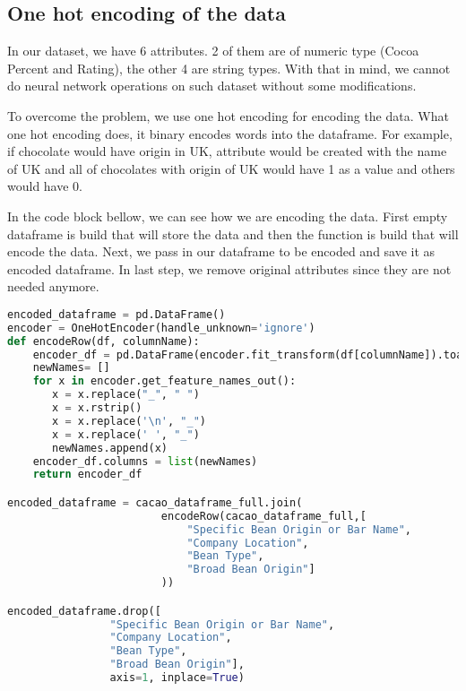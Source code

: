 \subsection{One hot encoding of the data}
In our dataset, we have 6 attributes. 2 of them are of numeric type (Cocoa Percent and Rating), the other 4 are string types. With that in mind, we cannot do neural network operations on such dataset without some modifications.

To overcome the problem, we use one hot encoding for encoding the data\parencite{jie2019one}. What one hot encoding does, it binary encodes words into the dataframe. For example, if chocolate would have origin in UK, attribute would be created with the name of UK and all of chocolates with origin of UK would have 1 as a value and others would have 0.

In the code block bellow, we can see how we are encoding the data. First empty dataframe is build that will store the data and then the function is build that will encode the data. Next, we pass in our dataframe to be encoded and save it as encoded dataframe. In last step, we remove original attributes since they are not needed anymore.

\begin{lstlisting}[language=Python, caption=One hot encoding of the data]
encoded_dataframe = pd.DataFrame()
encoder = OneHotEncoder(handle_unknown='ignore')
def encodeRow(df, columnName):
    encoder_df = pd.DataFrame(encoder.fit_transform(df[columnName]).toarray())
    newNames= []
    for x in encoder.get_feature_names_out():
       x = x.replace("_", " ")
       x = x.rstrip()
       x = x.replace('\n', "_")
       x = x.replace(' ', "_")
       newNames.append(x)
    encoder_df.columns = list(newNames)
    return encoder_df

encoded_dataframe = cacao_dataframe_full.join(
                        encodeRow(cacao_dataframe_full,[
                            "Specific Bean Origin or Bar Name",
                            "Company Location", 
                            "Bean Type", 
                            "Broad Bean Origin"]
                        ))

encoded_dataframe.drop([
                "Specific Bean Origin or Bar Name",
                "Company Location",
                "Bean Type",
                "Broad Bean Origin"],
                axis=1, inplace=True)
\end{lstlisting}